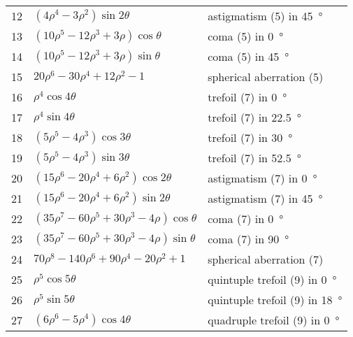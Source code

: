 \begin{center}
\begin{longtable}{cll}
12    &   $ (4\rho^4 - 3 \rho^2)\sin 2 \theta $                                     &  astigmatism (5) in \SI{45}{\degree} \\
13    &   $ (10 \rho^5 - 12 \rho^3 + 3 \rho)\cos\theta $                            &  coma (5) in \SI{0}{\degree} \\
14    &   $ (10 \rho^5 - 12 \rho^3 + 3 \rho)\sin\theta $                            &  coma (5) in \SI{45}{\degree} \\
15    &   $ 20 \rho^6 - 30 \rho^4 + 12\rho^2 - 1 $                                  &  spherical aberration (5) \\
16    &   $ \rho^4 \cos 4 \theta $                                                  &  trefoil (7) in \SI{0}{\degree} \\
17    &   $ \rho^4 \sin 4 \theta $                                                  &  trefoil (7) in \SI{22.5}{\degree} \\
18    &   $ (5 \rho^5 - 4 \rho^3)\cos 3 \theta $                                    &  trefoil (7) in \SI{30}{\degree} \\
19    &   $ (5 \rho^5 - 4 \rho^3)\sin 3 \theta $                                    &  trefoil (7) in \SI{52.5}{\degree} \\
20    &   $ (15\rho^6 - 20 \rho^4 + 6 \rho^2)\cos 2 \theta $                        &  astigmatism (7) in \SI{0}{\degree} \\
21    &   $ (15\rho^6 - 20 \rho^4 + 6 \rho^2)\sin 2 \theta $                        &  astigmatism (7) in \SI{45}{\degree} \\
22    &   $ (35 \rho^7 - 60 \rho^5 + 30 \rho^3 - 4 \rho)\cos\theta $                &  coma (7) in \SI{0}{\degree} \\
23    &   $ (35 \rho^7 - 60 \rho^5 + 30 \rho^3 - 4 \rho)\sin\theta $                &  coma (7) in \SI{90}{\degree} \\
24    &   $ 70 \rho^8 - 140 \rho^6 + 90 \rho^4 - 20 \rho^2 + 1 $                    &  spherical aberration (7) \\
25    &   $ \rho^5 \cos 5 \theta $                                                  &  quintuple trefoil (9) in \SI{0}{\degree} \\
26    &   $ \rho^5 \sin 5 \theta $                                                  &  quintuple trefoil (9) in \SI{18}{\degree} \\
27    &   $ (6\rho^6 - 5 \rho^4)\cos 4 \theta $                                     &  quadruple trefoil (9) in \SI{0}{\degree} \\

\end{longtable}
\end{center}
